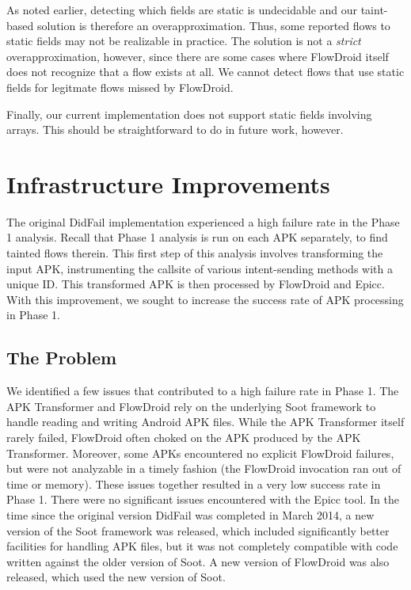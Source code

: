 As noted earlier, detecting which fields are static is undecidable and our taint-based solution is therefore an overapproximation. Thus, some reported flows to static fields may not be realizable in practice. The solution is not a \emph{strict} overapproximation, however, since there are some cases where FlowDroid itself does not recognize that a flow exists at all. We cannot detect flows that use static fields for legitmate flows missed by FlowDroid. 

Finally, our current implementation does not support static fields involving arrays. This should be straightforward to do in future work, however.


\chapter{Infrastructure Improvements} \label{chap:infrastructure}
\label{sec:infrastructure}
The original DidFail implementation experienced a high failure rate in the Phase 1 analysis.  Recall that Phase 1 analysis is run on each APK separately, to find tainted flows therein.  This first step of this analysis involves transforming the input APK, instrumenting the callsite of various intent-sending methods with a unique ID.  This transformed APK is then processed by FlowDroid and Epicc.  With this improvement, we sought to increase the success rate of APK processing in Phase 1.

\section{The Problem}
We identified a few issues that contributed to a high failure rate in Phase 1.  The APK Transformer and FlowDroid rely on the underlying Soot framework to handle reading and writing Android APK files. While the APK Transformer itself rarely failed, FlowDroid often choked on the APK produced by the APK Transformer.  Moreover, some APKs encountered no explicit FlowDroid failures, but were not analyzable in a timely fashion (the FlowDroid invocation ran out of time or memory).   These issues together resulted in a very low success rate in Phase 1.  There were no significant issues encountered with the Epicc tool.  In the time since the original version DidFail was completed in March 2014, a new version of the Soot framework was released, which included significantly better facilities for handling APK files, but it was not completely compatible with code written against the older version of Soot.  A new version of FlowDroid was also released, which used the new version of Soot.

